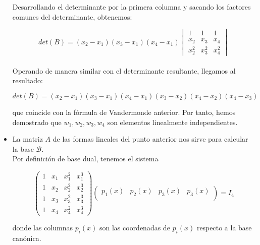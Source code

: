 \begin{itemize}[$\bullet$]
    Desarrollando el determinante por la primera columna y sacando los factores comunes del determinante, obtenemos:

    \begin{equation*}
        det(B)
        =
        (x_2 - x_1)(x_3 - x_1)(x_4 - x_1)
        \begin{vmatrix}
            1     & 1     & 1   \\[6pt]
            x_2   & x_3   & x_4 \\[6pt]
            x_2^2 & x_3^2 & x_4^2
        \end{vmatrix}
    \end{equation*}\\

    Operando de manera similar con el determinante resultante, llegamos al resultado:

    \begin{equation*}
        det(B)
        =
        (x_2 - x_1)(x_3 - x_1)(x_4 - x_1)(x_3 - x_2)(x_4 - x_2)(x_4 - x_3)
    \end{equation*}

    que coincide con la fórmula de Vandermonde anterior. Por tanto, hemos demostrado que $w_1, w_2, w_3, w_4$ son elementos linealmente independientes.


    \vspace{20px}
    \item La matriz $A$ de las formas lineales del punto anterior nos sirve para calcular la base $\mathcal{B}$.\\

    Por definición de base dual, tenemos el sistema

    \begin{equation*}
        \begin{pmatrix}
            1 & x_1 & x_1^2 & x_1^3 \\[6pt]
            1 & x_2 & x_2^2 & x_2^3 \\[6pt]
            1 & x_3 & x_3^2 & x_3^3 \\[6pt]
            1 & x_4 & x_4^2 & x_4^3
        \end{pmatrix}
        \left( \begin{array}{c|c|c|c}
                   p_1(x) & p_2(x) & p_3(x) & p_3(x) \\
        \end{array}\right)   = I_4
    \end{equation*}

    donde las columnas $p_i(x)$ son las coordenadas de $p_i(x)$ respecto a la base canónica.\\


\end{itemize}
